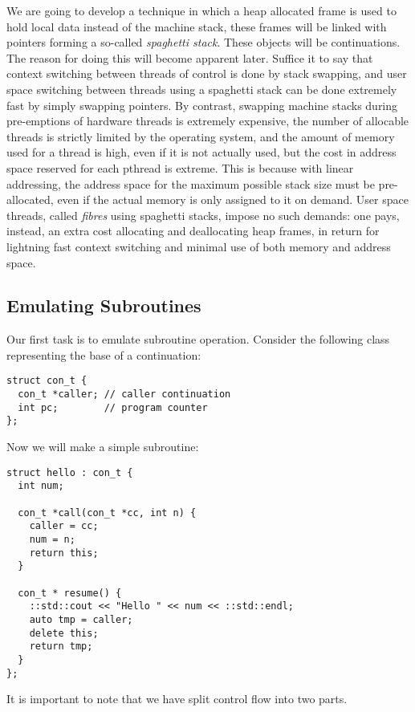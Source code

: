 \documentclass[oneside]{book}
\begin{document}
We are going to develop a technique in which a heap allocated frame is
used to hold local data instead of the machine stack, these frames
will be linked with pointers forming a so-called {\em spaghetti stack}.
These objects will be continuations. The reason for doing this will
become apparent later. Suffice it to say that context switching
between threads of control is done by stack swapping, and user space
switching between threads using a spaghetti stack can be done extremely
fast by simply swapping pointers. By contrast, swapping machine stacks
during pre-emptions of hardware threads is extremely expensive, the
number of allocable threads is strictly limited by the operating system,
and the amount of memory used for a thread is high, even if it
is not actually used, but the cost in address space reserved for each pthread
is extreme. This is because with linear addressing, the address space for
the maximum possible stack size must be pre-allocated, even if the actual
memory is only assigned to it on demand. User space threads, called {\em fibres}
using spaghetti stacks, impose no such demands: one pays, instead, an extra 
cost allocating and deallocating heap frames, in return for lightning fast
context switching and minimal use of both memory and address space.

\subsection{Emulating Subroutines}
Our first task is to emulate subroutine operation.
Consider the following class representing the base
of a continuation:

\begin{verbatim}
struct con_t {
  con_t *caller; // caller continuation
  int pc;        // program counter
};
\end{verbatim}

Now we will make a simple subroutine:

\begin{verbatim}
struct hello : con_t {
  int num;

  con_t *call(con_t *cc, int n) { 
    caller = cc;
    num = n; 
    return this;
  }

  con_t * resume() {
    ::std::cout << "Hello " << num << ::std::endl;
    auto tmp = caller;
    delete this; 
    return tmp; 
  }
};
\end{verbatim}

It is important to note that we have split control flow into two parts.
\end{document}
